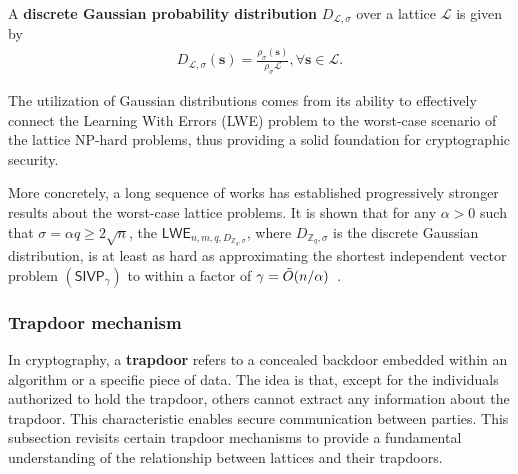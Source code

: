 \documentclass[cryptography,review,submit,pdftex,moreauthors,amsmath,amssymb,aps,strict]{Definitions/mdpi}
\begin{document}
A \textbf{discrete Gaussian probability distribution} $D_{\mathcal{L},\sigma}$ over a lattice $\mathcal{L}$ is given by
\begin{align}
    D_{\mathcal{L},\sigma}(\mathbf{s})=\displaystyle{\frac{\rho_{\sigma}(\mathbf{s})}{\rho_{\sigma}{\mathcal{L}}}}, \forall \mathbf{s}\in\mathcal{L}.
\end{align}


The utilization of Gaussian distributions comes from its ability to effectively connect the Learning With Errors (LWE) problem to the worst-case scenario of the lattice NP-hard problems, thus providing a solid foundation for cryptographic security.

More concretely, a long sequence of works has established progressively stronger results about the worst-case lattice problems. It is shown that for any $\alpha>0$ such that $\sigma=\alpha q \geq 2\sqrt{n}$, the $\mathsf{LWE}_{n,m,q, D_{\mathbb{Z}_q,\sigma}}$, where $D_{\mathbb{Z}_q,\sigma}$ is the discrete Gaussian distribution, is at least as hard as approximating the shortest independent vector problem $(\mathsf{SIVP}_{\gamma})$ to within a factor of $\gamma = \Tilde{O}(n/\alpha)$~\cite{Reg09,RPS17}.





\subsubsection{Trapdoor mechanism}

In cryptography, a \textbf{trapdoor} refers to a concealed backdoor embedded within an algorithm or a specific piece of data. The idea is that, except for the individuals authorized to hold the trapdoor, others cannot extract any information about the trapdoor. This characteristic enables secure communication between parties. This subsection revisits certain trapdoor mechanisms to provide a fundamental understanding of the relationship between lattices and their trapdoors.
\end{document}
